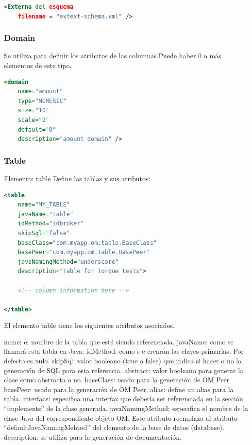 \documentclass[12pt, oneside]{article}
\begin{document}
\begin{lstlisting}[language=XML]
<Externa del esquema
	filename = "extext-schema.xml" />
\end{lstlisting}

\subsubsection{Domain}
Se utiliza para definir los atributos de las columnas.Puede haber 0 o más elementos de este tipo. 

\begin{lstlisting}[language=XML]
<domain
	name="amount"
	type="NUMERIC"
	size="10"
	scale="2"
	default="0"
	description="amount domain" />
\end{lstlisting}

\subsubsection{Table}
Elemento: table
Define las tablas y sus atributos:

\begin{lstlisting}[language=XML]
<table
	name="MY_TABLE"
	javaName="table"
	idMethod="idbroker"
	skipSql="false"
	baseClass="com.myapp.om.table.BaseClass"
	basePeer="com.myapp.om.table.BasePeer"
	javaNamingMethod="underscore"
	description="Table for Torque tests">

	<!-- column information here -->

</table>
\end{lstlisting}

El elemento table tiene los siguientes atributos asociados.

name: el nombre de la tabla que está siendo referenciada.
javaName: como se llamará esta tabla en Java.
idMethod: como s e crearán las claves primarias. Por defecto es nulo.
skipSql: valor booleano (true o false) que indica si hacer o no la generación de SQL para esta referencia.
abstract: valor booleano para generar la clase como abstracta o no.
baseClass: usado para la generación de OM Peer
basePeer: usado para la generación de OM Peer.
alias: define un alias para la tabla.
interface: especifica una interfaz que debería ser referenciada en la sección “implements” de la clase generada.
javaNamingMethod: especifica el nombre de la clase Java del correspondiente objeto OM. Este atributo reemplaza al atributo “defaultJavaNamingMehtod” del elemento de la base de datos (database).
description: se utiliza para la generación de documentación.
\end{document}
